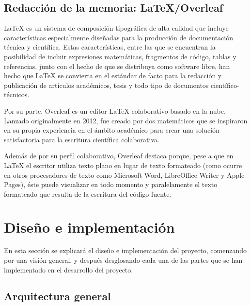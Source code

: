 \documentclass[a4paper, 12pt]{book}
\begin{document}
\section{Redacción de la memoria: LaTeX/Overleaf}
\label{sec:redaccion_de_la_memoria}

LaTeX es un sistema de composición tipográfica de alta calidad que incluye características especialmente diseñadas para la producción de documentación técnica y científica. Estas características, entre las que se encuentran la posibilidad de incluir expresiones matemáticas, fragmentos de código, tablas y referencias, junto con el hecho de que se distribuya como software libre, han hecho que LaTeX se convierta en el estándar de facto para la redacción y publicación de artículos académicos, tesis y todo tipo de documentos científico-técnicos. 

Por su parte, Overleaf es un editor LaTeX colaborativo basado en la nube. Lanzado originalmente en 2012, fue creado por dos matemáticos que se inspiraron en su propia experiencia en el ámbito académico para crear una solución satisfactoria para la escritura científica colaborativa.

Además de por su perfil colaborativo, Overleaf destaca porque, pese a que en LaTeX el escritor utiliza texto plano en lugar de texto formateado (como ocurre en otros procesadores de texto como Microsoft Word, LibreOffice Writer y Apple Pages), éste puede visualizar en todo momento y paralelamente el texto formateado que resulta de la escritura del código fuente.

\clearpage


\chapter{Diseño e implementación}
\label{chap:diseño}

En esta sección se explicará el diseño e implementación del proyecto, comenzando por una visión general, y después desglosando cada una de las partes que se han implementado en el desarrollo del proyecto.

\section{Arquitectura general} 
\label{sec:arquitectura}
\end{document}
